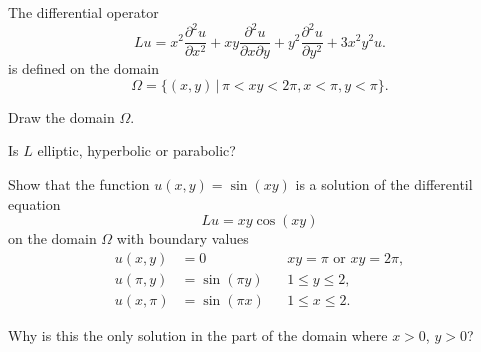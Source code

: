The differential operator
\[
Lu=
x^2\frac{\partial^2u}{\partial x^2}
+xy\frac{\partial^2u}{\partial x\partial y}
+y^2\frac{\partial^2u}{\partial y^2}
+3x^2y^2u.
\]
is defined on the domain
\[
\Omega=\{
(x,y)\,|\,\pi < xy < 2\pi, x < \pi,y < \pi
\}.
\]
\begin{teilaufgaben}
\item
Draw the domain $\Omega$.
\item
Is $L$ elliptic, hyperbolic or parabolic?
\item
Show that the function $u(x,y)=\sin(xy)$ is a solution of the differentil
equation
\[
Lu=xy\cos(xy)
\]
on the domain $\Omega$ with boundary values
\begin{align*}
u(x,y)&=0            &&\text{$xy=\pi$ or $xy=2\pi$},\\
u(\pi,y)&=\sin(\pi y)&&1\le y\le 2,\\
u(x,\pi)&=\sin(\pi x)&&1\le x\le 2.
\end{align*}
\item
Why is this the only solution in the part of the domain where
$x>0$, $y>0$?
\end{teilaufgaben}

